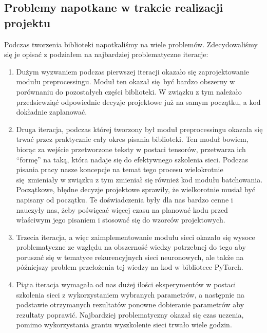 \subsection{Problemy napotkane w trakcie realizacji projektu}
Podczas tworzenia biblioteki napotkaliśmy na wiele problemów. Zdecydowaliśmy się je opisać z podziałem na 
najbardziej problematyczne iteracje:

\begin{enumerate}
  \item Dużym wyzwaniem podczas pierwszej iteracji okazało
  się zaprojektowanie modułu preprocessingu. Moduł ten okazał się być bardzo obszerny w porównaniu do
  pozostałych części biblioteki. W związku z tym należało przedsiewziąć odpowiednie decyzje projektowe 
  już na samym początku, a kod dokładnie zaplanować.
  
  \item Druga iteracja, podczas której tworzony był moduł preprocessingu okazała się trwać przez praktycznie
  cały okres pisania biblioteki. Ten moduł bowiem, biorąc za wejście przetworzone teksty w postaci tensorów,
  przetwarza ich ``formę'' na taką, która nadaje się do efektywnego szkolenia sieci. Podczas pisania pracy 
  nasze koncepcje na temat tego procesu wielokrotnie się zmieniały w związku z tym zmieniał się również
  kod modułu batchowania. Początkowe, błędne decyzje projektowe sprawiły, że wielkorotnie musiał być 
  napisany od początku. Te doświadczenia były dla nas bardzo cenne i nauczyły nas, żeby poświęcać
  więcej czasu na planować kodu przed właściwym jego pisaniem i stosować się do wzorców projektowych.

  \item Trzecia iteracja, a więc zaimplementowanie modułu sieci okazało się wysoce problematyczne ze względu na obszerność 
  wiedzy potrzebnej do tego aby poruszać się w tematyce rekurencyjnych sieci neuronowych, ale także
  na późniejszy problem przełożenia tej wiedzy na kod w bibliotece PyTorch.
  
  \item Piąta iteracja wymagała od nas dużej ilości eksperymentów w postaci szkolenia sieci z wykorzystaniem wybranych
  parametrów, a następnie na podstawie otrzymanych rezultatów ponowne dobieranie parametrów aby rezultaty poprawić.
  Najbardziej problematyczny okazał się czas uczenia, pomimo wykorzystania grantu wyszkolenie sieci trwało
  wiele godzin.
\end{enumerate}
